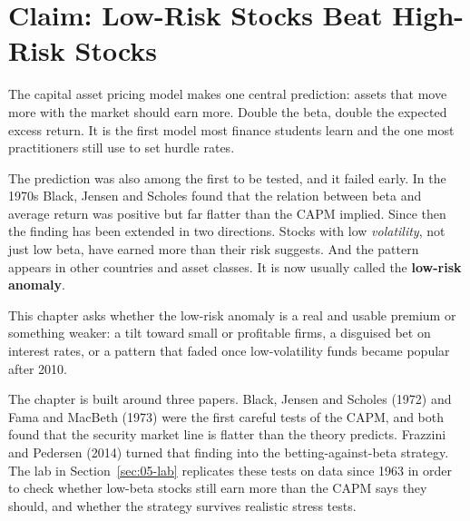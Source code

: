 \makeatletter
{}
\makeatother

\chapter{Claim: Low-Risk Stocks Beat High-Risk Stocks}
\label{ch:05}

The capital asset pricing model makes one central prediction: assets that move more with the market should earn more. Double the beta, double the expected excess return. It is the first model most finance students learn and the one most practitioners still use to set hurdle rates.

The prediction was also among the first to be tested, and it failed early. In the 1970s Black, Jensen and Scholes found that the relation between beta and average return was positive but far flatter than the CAPM implied. Since then the finding has been extended in two directions. Stocks with low \emph{volatility}, not just low beta, have earned more than their risk suggests. And the pattern appears in other countries and asset classes. It is now usually called the \textbf{low-risk anomaly}.

This chapter asks whether the low-risk anomaly is a real and usable premium or something weaker: a tilt toward small or profitable firms, a disguised bet on interest rates, or a pattern that faded once low-volatility funds became popular after 2010.

The chapter is built around three papers. Black, Jensen and Scholes (1972) and Fama and MacBeth (1973) were the first careful tests of the CAPM, and both found that the security market line is flatter than the theory predicts. Frazzini and Pedersen (2014) turned that finding into the betting-against-beta strategy. The lab in Section~\ref{sec:05-lab} replicates these tests on data since 1963 in order to check whether low-beta stocks still earn more than the CAPM says they should, and whether the strategy survives realistic stress tests.

